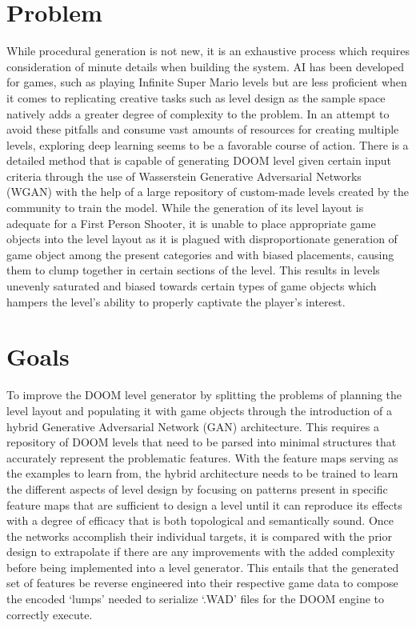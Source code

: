 \documentclass{Configuration_Files/PoliMi3i_thesis}
\begin{document}
\section{Problem}
\label{sec:problem}
While procedural generation is not new, it is an exhaustive process which requires 
consideration of minute details when building the system. AI has been developed for 
games, such as playing Infinite Super Mario levels \cite{KaS12} but are less proficient when it 
comes to replicating creative tasks such as level design as the sample space natively 
adds a greater degree of complexity to the problem. In an attempt to avoid these 
pitfalls and consume vast amounts of resources for creating multiple levels, 
exploring deep learning seems to be a favorable course of action. There is a detailed 
method that is capable of generating DOOM level given certain input criteria 
through the use of Wasserstein Generative Adversarial Networks (WGAN) \cite{MaA17} with the help of a large 
repository of custom-made levels created by the community to train the model. 
While the generation of its level layout is adequate for a  
First Person Shooter, it is unable to place appropriate game objects into the level layout as it is plagued 
with disproportionate generation of game object among the present categories and with
biased placements, causing them to clump together in certain sections of the 
level. This results in levels unevenly saturated and biased towards certain types of 
game objects which hampers the level’s ability to properly captivate the player’s 
interest.

\section{Goals}
To improve the DOOM level generator by splitting the problems of planning the level 
layout and populating it with game objects through the introduction of a hybrid 
Generative Adversarial Network (GAN) architecture. This requires a repository of DOOM 
levels that need to be parsed into minimal structures that accurately represent the problematic 
features. With the feature maps serving as the examples to learn from, the hybrid architecture needs to be 
trained to learn the different aspects of level design by focusing on patterns present in specific 
feature maps that are sufficient to design a level until it can reproduce its effects with a degree 
of efficacy that is both topological and semantically sound. Once the networks accomplish their 
individual targets, it is compared with the prior design to extrapolate if there are any improvements with the added 
complexity before being implemented into a level generator. This entails that the generated set of features 
be reverse engineered into their respective game data to compose the encoded ‘lumps’ needed to serialize ‘.WAD’ 
files for the DOOM engine to correctly execute.
\end{document}
